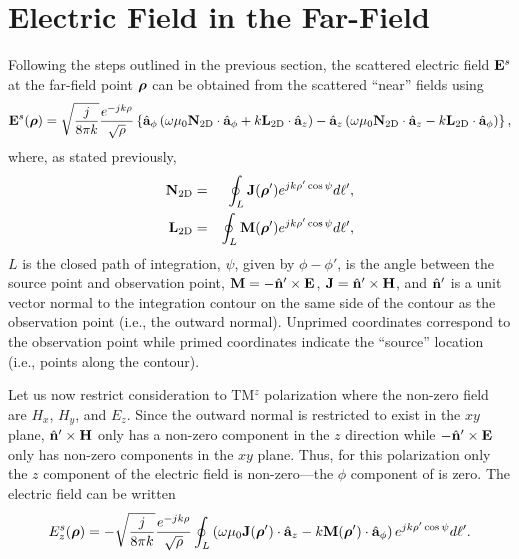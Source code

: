 \section{Electric Field in the Far-Field}

Following the steps outlined in the previous section, the scattered
electric field $\mathbf{E}^s$ at the far-field point $\boldsymbol{\rho}$ can be
obtained from the scattered ``near'' fields using
\begin{equation}
  \mathbf{E}^s(\boldsymbol{\rho}) =
  \sqrt{\frac{j}{8\pi k}} \frac{e^{-jk\rho}}{\sqrt{\rho}} 
  \left\{\hat{\mathbf{a}}_{\phi}\left(\omega\mu_0\mathbf{N}_{\mbox{\scriptsize 2D}}\cdot\hat{\mathbf{a}}_{\phi}
	                     +k\mathbf{L}_{\mbox{\scriptsize 2D}}\cdot\hat{\mathbf{a}}_{z}\right)
       - \hat{\mathbf{a}}_{z}\left(\omega\mu_0\mathbf{N}_{\mbox{\scriptsize 2D}}\cdot\hat{\mathbf{a}}_{z}
	                     -k\mathbf{L}_{\mbox{\scriptsize 2D}}\cdot\hat{\mathbf{a}}_{\phi}\right)
  \right\},
\label{eq:esfar}
\end{equation}
where, as stated previously,
\begin{eqnarray}
  \mathbf{N}_{\mbox{\scriptsize 2D}} &=& 
    \oint_L \mathbf{J}(\boldsymbol{\rho}') e^{jk\rho'\cos\psi} d\ell', \\
  \mathbf{L}_{\mbox{\scriptsize 2D}} &=& 
    \oint_L \mathbf{M}(\boldsymbol{\rho}') e^{jk\rho'\cos\psi} d\ell',
\end{eqnarray}
$L$ is the closed path of integration, $\psi$, given by $\phi-\phi'$,
is the angle between the source point and observation point, $\mathbf{M} =
-\hat{\mathbf{n}}'\times\mathbf{E}$, $\mathbf{J} = \hat{\mathbf{n}}'\times\mathbf{H}$, and
$\hat{\mathbf{n}}'$ is a unit vector normal to the integration contour on
the same side of the contour as the observation point (i.e., the
outward normal).  Unprimed coordinates correspond to the observation
point while primed coordinates indicate the ``source'' location (i.e.,
points along the contour).

Let us now restrict consideration to TM$^z$ polarization where the
non-zero field are $H_x$, $H_y$, and $E_z$.  Since the outward normal
is restricted to exist in the $xy$ plane, $\hat{\mathbf{n}}'\times\mathbf{H}$ only has
a non-zero component in the $z$ direction while $-\hat{\mathbf{n}}'\times\mathbf{E}$
only has non-zero components in the $xy$ plane.  Thus, for this
polarization only the $z$ component of the electric field is
non-zero---the $\phi$ component of  is zero.  The
electric field can be written
\begin{equation}
  E^s_z(\boldsymbol{\rho}) =
  -\sqrt{\frac{j}{8\pi k}} \frac{e^{-jk\rho}}{\sqrt{\rho}} 
  \oint_L
  \left(\omega\mu_0\mathbf{J}(\boldsymbol{\rho}')\cdot\hat{\mathbf{a}}_{z}
	                     -k\mathbf{M}(\boldsymbol{\rho}')\cdot\hat{\mathbf{a}}_{\phi}\right)
  e^{jk\rho'\cos\psi} d\ell'.
\label{eq:ezfar}
\end{equation}


